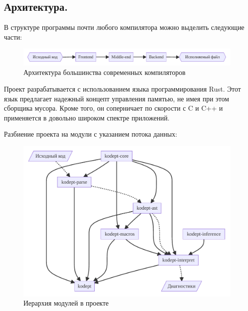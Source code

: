 ﻿%
\subsection{Архитектура.}
\begin{frame}%

    В структуре программы почти любого компилятора можно выделить следующие части:

    \begin{figure}[H]
        \centering
        \includegraphics[width=\textwidth]{figures/arch}
        \caption{Архитектура большинства современных компиляторов}
        \label{fig:arch}
    \end{figure}

    Проект разрабатывается с использованием языка программирования Rust.
    Этот язык предлагает надежный концепт управления памятью, не имея при этом сборщика мусора.
    Кроме того, он соперничает по скорости с C и C++ и применяется в довольно широком спектре приложений.

\end{frame}

\begin{frame}
    Разбиение проекта на модули с указанием потока данных:
    \begin{figure}[H]
        \centering
        \includegraphics[height=0.7\textheight]{figures/modules}
        \caption{Иерархия модулей в проекте}
        \label{fig:modules}
    \end{figure}
\end{frame}
